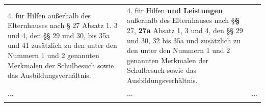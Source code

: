 \documentclass[10pt,a4paper,landscape]{article}
\begin{document}
\begin{longtable}{|L{8.2cm}|L{8.2cm}|L{8.2cm}|}
4.   \newline für Hilfen außerhalb des Elternhauses nach  \newline \S{} 27 Absatz 1, 3 und 4, den \S{}\S{} 29 und 30,   bis 35a und 41 zusätzlich zu den unter  \newline den Nummern 1 und 2 genannten  \newline Merkmalen der Schulbesuch sowie das  \newline Ausbildungsverhältnis. & 4.   \newline für Hilfen \textbf{\textcolor{diffred}{und Leistungen }}außerhalb des  \newline Elternhauses nach \S{}\textbf{\textcolor{diffred}{\S{}}} 27, \textbf{\textcolor{diffred}{27a}} Absatz 1, 3  \newline und 4, den \S{}\S{} 29 und 30, 32 bis 35a und   zusätzlich zu den unter den Nummern 1  \newline und 2 genannten Merkmalen der  \newline Schulbesuch sowie das  \newline Ausbildungsverhältnis. &  \\
\hhline{|---|}
... & ... & ... \\
\hhline{|---|}

\end{longtable}
\end{document}
